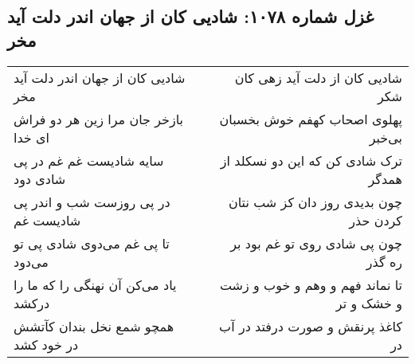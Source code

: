 \begin{center}
\section*{غزل شماره ۱۰۷۸: شادیی کان از جهان اندر دلت آید مخر}
\label{sec:1078}
\begin{longtable}{l p{0.5cm} r}
شادیی کان از جهان اندر دلت آید مخر
&&
شادیی کان از دلت آید زهی کان شکر
\\
بازخر جان مرا زین هر دو فراش ای خدا
&&
پهلوی اصحاب کهفم خوش بخسبان بی‌خبر
\\
سایه شادیست غم غم در پی شادی دود
&&
ترک شادی کن که این دو نسکلد از همدگر
\\
در پی روزست شب و اندر پی شادیست غم
&&
چون بدیدی روز دان کز شب نتان کردن حذر
\\
تا پی غم می‌دوی شادی پی تو می‌دود
&&
چون پی شادی روی تو غم بود بر ره گذر
\\
یاد می‌کن آن نهنگی را که ما را درکشد
&&
تا نماند فهم و وهم و خوب و زشت و خشک و تر
\\
همچو شمع نخل بندان کآتشش در خود کشد
&&
کاغذ پرنقش و صورت درفتد در آب در
\\
\end{longtable}
\end{center}
